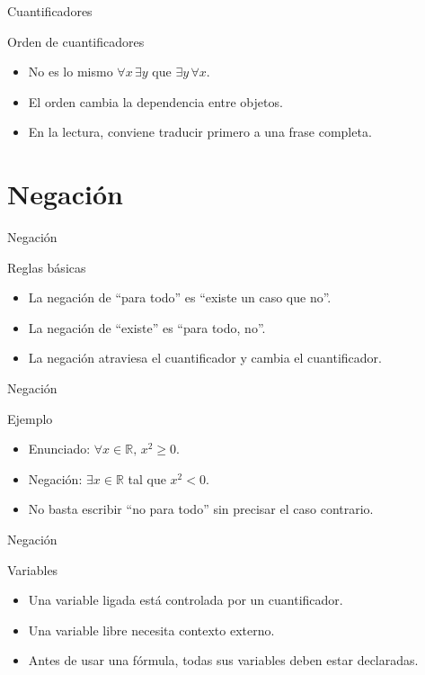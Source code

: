 \documentclass[aspectratio=169,11pt]{beamer}
\begin{document}
\begin{frame}{Cuantificadores}
\begin{block}{Orden de cuantificadores}
\begin{itemize}
  \item No es lo mismo \(\forall x\,\exists y\) que \(\exists y\,\forall x\).
  \item El orden cambia la dependencia entre objetos.
  \item En la lectura, conviene traducir primero a una frase completa.
\end{itemize}
\end{block}
\end{frame}

\section{Negación}

\begin{frame}{Negación}
\begin{block}{Reglas básicas}
\begin{itemize}
  \item La negación de ``para todo'' es ``existe un caso que no''.
  \item La negación de ``existe'' es ``para todo, no''.
  \item La negación atraviesa el cuantificador y cambia el cuantificador.
\end{itemize}
\end{block}
\end{frame}

\begin{frame}{Negación}
\begin{block}{Ejemplo}
\begin{itemize}
  \item Enunciado: \(\forall x\in\mathbb{R},\, x^2\geq 0\).
  \item Negación: \(\exists x\in\mathbb{R}\) tal que \(x^2<0\).
  \item No basta escribir ``no para todo'' sin precisar el caso contrario.
\end{itemize}
\end{block}
\end{frame}

\begin{frame}{Negación}
\begin{block}{Variables}
\begin{itemize}
  \item Una variable ligada está controlada por un cuantificador.
  \item Una variable libre necesita contexto externo.
  \item Antes de usar una fórmula, todas sus variables deben estar declaradas.
\end{itemize}
\end{block}
\end{frame}
\end{document}
